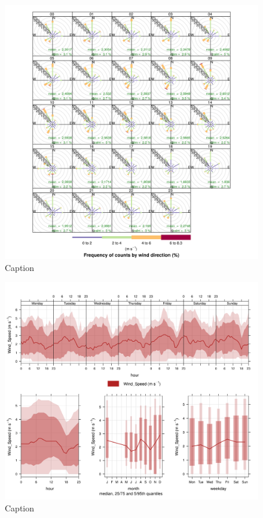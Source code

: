 \documentclass{nwureport}
\begin{document}
\begin{figure}[!htb]
    \centering
    \includegraphics[width=\textwidth]{images/Wedela-windrose-hourly.png}
    \caption{Caption}
    \label{fig:summary}
\end{figure}

\begin{figure}[!htb]
    \centering
    \includegraphics[width=\textwidth]{images/Wedela_Wind_Speed_timevary.png}
    \caption{Caption}
    \label{fig:summary}
\end{figure}
\end{document}
